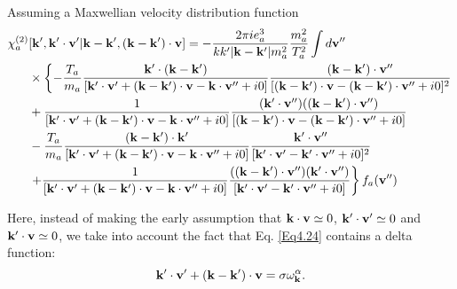 \documentclass[12pt,a4paper,ruledheader]{report}
\begin{document}
\begin{appendix}
Assuming a Maxwellian velocity distribution function
\begin{equation}
  \begin{split}
    \label{chi2,2}
    \chi_a^{(2)}&[{\bf k'},{\bf k'\cdot v'}|
    {\bf k-k'},({\bf k-k'})\cdot{\bf v}]
    =-\frac{2\pi i e_a^3}{k k'|{\bf k-k'}|m_a^2}
    \frac{m_a^2}{T_a^2}\int d{\bf v''}\\
    &\times\left\{-\frac{T_a}{m_a}\frac{ {\bf k'}
	\cdot({\bf k-k'})}{[{\bf k'\cdot v'}
	+({\bf k-k'})\cdot{\bf v}-{\bf k}\cdot{\bf v''}+i0]}
      \frac{({\bf k-k'})\cdot{\bf v''}}{[({\bf k-k'})
	\cdot {\bf v}-({\bf k-k'})\cdot{\bf v''}+i0]^2} \right.\\
    & + \frac{1}{[{\bf k'\cdot v'}+({\bf k-k'})\cdot{\bf v}
      -{\bf k}\cdot{\bf v''}+i0]}\frac{({\bf k'}\cdot{\bf v''})
      (({\bf k-k'})\cdot{\bf v''})}{[({\bf k-k'})\cdot {\bf v}
      -({\bf k-k'})\cdot{\bf v''}+i0]}\\
    & -\frac{T_a}{m_a} \frac{({\bf k-k'})\cdot {\bf k'}}
    {[{\bf k'}\cdot {\bf v'}+({\bf k-k'})\cdot {\bf v}
      -{\bf k}\cdot{\bf v''}+i0]} \frac{{\bf k'}\cdot{\bf v''}}
    {[{\bf k'\cdot v'}-{\bf k'}\cdot{\bf v''}+i0]^2}\\
    &\left. + \frac{1}{[{\bf k'}\cdot {\bf v'}+({\bf k-k'})
	\cdot {\bf v}-{\bf k}\cdot{\bf v''}+i0]}\frac{(({\bf k-k'})
	\cdot{\bf v''}) ({\bf k'}\cdot{\bf v''})}{[{\bf k'\cdot v'}
	-{\bf k'}\cdot{\bf v''}+i0]} \right\}f_a({\bf v''})
  \end{split}
\end{equation}

Here, instead of making the early assumption that
${\bf k} \cdot {\bf v}\simeq 0$, ${\bf k}' \cdot {\bf v}'\simeq 0$
and ${\bf k}'\cdot {\bf v} \simeq 0$, we take into account
the fact that Eq. \eqref{Eq4.24} contains a delta function:
\begin{equation}
{\bf k'\cdot v'}+({\bf k-k'})\cdot{\bf v}= \sigma\omega_{\bf k}^\alpha.
\end{equation}


\end{appendix}
\end{document}
